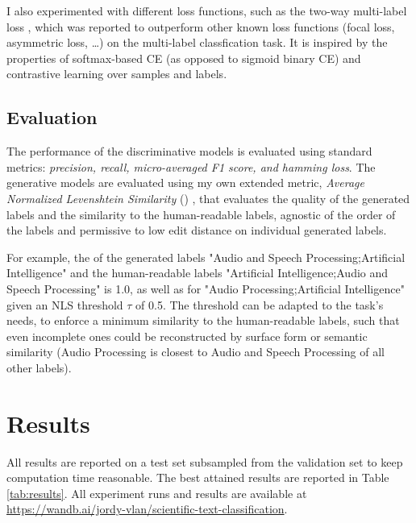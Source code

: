 \documentclass[11pt,letterpaper]{article}
\begin{document}
I also experimented with different loss functions, such as the two-way multi-label loss \cite{kobayashi2023two}, which was reported to outperform other known loss functions (focal loss, asymmetric loss, \ldots) on the multi-label classfication task. It is inspired by the properties of softmax-based CE (as opposed to sigmoid binary CE) and contrastive learning over samples and labels.

\subsection{Evaluation}

The performance of the discriminative models is evaluated using standard metrics: \textit{precision, recall, micro-averaged F1 score, and hamming loss}.
The generative models are evaluated using my own extended metric, \textit{Average Normalized Levenshtein Similarity} (\ANLS) \cite{VanLandeghem2023dude}, that evaluates the quality of the generated labels and the similarity to the human-readable labels, agnostic of the order of the labels and permissive to low edit distance on individual generated labels.

For example, the \ANLS{} of the generated labels "Audio and Speech Processing;Artificial Intelligence" and the human-readable labels "Artificial Intelligence;Audio and Speech Processing" is 1.0, as well as for "Audio Processing;Artificial Intelligence" given an NLS threshold $\tau$ of 0.5. The threshold can be adapted to the task's needs, \eg to enforce a minimum similarity to the human-readable labels, such that even incomplete ones could be reconstructed by surface form or semantic similarity (\eg Audio Processing is closest to Audio and Speech Processing of all other labels).

\section{Results}

All results are reported on a test set subsampled from the validation set to keep computation time reasonable. The best attained results are reported in Table \ref{tab:results}.
All experiment runs and results are available at \url{https://wandb.ai/jordy-vlan/scientific-text-classification}.
\end{document}
